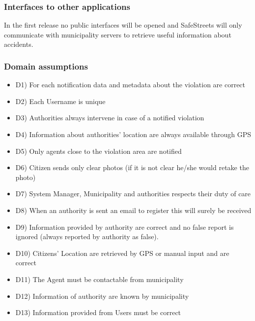 \subsubsection{ Interfaces to other applications}
In the first release no public interfaces will be opened and SafeStreets will only communicate with municipality servers to retrieve useful information about accidents.
\subsubsection{ Domain assumptions}
\begin{itemize}
\item D1) For each notification data and metadata about the violation are correct
\item D2) Each Username is unique
\item D3) Authorities always intervene in case of a notified violation
\item D4) Information about authorities’ location are always available through GPS 
\item D5) Only agents close to the violation area are notified 
\item D6) Citizen sends only clear photos (if it is not clear he/she would retake the photo)
\item D7) System Manager, Municipality and authorities respects their duty of care
\item D8) When an authority is sent an email to register this will surely be received
\item D9) Information provided by authority are correct and no false report is ignored (always reported by authority as false).
\item D10) Citizens’ Location are retrieved by GPS or manual input and are correct
\item D11) The Agent must be contactable from municipality  
\item D12) Information of authority are known by municipality
\item D13) Information provided from Users must be correct
\end{itemize}
